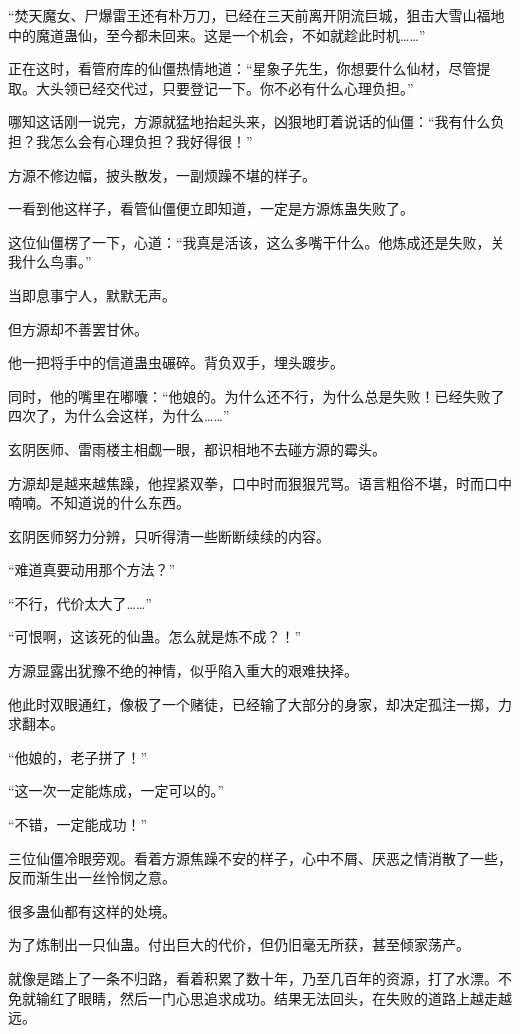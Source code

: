 \begin{this_body}
“焚天魔女、尸爆雷王还有朴万刀，已经在三天前离开阴流巨城，狙击大雪山福地中的魔道蛊仙，至今都未回来。这是一个机会，不如就趁此时机……”

正在这时，看管府库的仙僵热情地道：“星象子先生，你想要什么仙材，尽管提取。大头领已经交代过，只要登记一下。你不必有什么心理负担。”

哪知这话刚一说完，方源就猛地抬起头来，凶狠地盯着说话的仙僵：“我有什么负担？我怎么会有心理负担？我好得很！”

方源不修边幅，披头散发，一副烦躁不堪的样子。

一看到他这样子，看管仙僵便立即知道，一定是方源炼蛊失败了。

这位仙僵楞了一下，心道：“我真是活该，这么多嘴干什么。他炼成还是失败，关我什么鸟事。”

当即息事宁人，默默无声。

但方源却不善罢甘休。

他一把将手中的信道蛊虫碾碎。背负双手，埋头踱步。

同时，他的嘴里在嘟囔：“他娘的。为什么还不行，为什么总是失败！已经失败了四次了，为什么会这样，为什么……”

玄阴医师、雷雨楼主相觑一眼，都识相地不去碰方源的霉头。

方源却是越来越焦躁，他捏紧双拳，口中时而狠狠咒骂。语言粗俗不堪，时而口中喃喃。不知道说的什么东西。

玄阴医师努力分辨，只听得清一些断断续续的内容。

“难道真要动用那个方法？”

“不行，代价太大了……”

“可恨啊，这该死的仙蛊。怎么就是炼不成？！”

方源显露出犹豫不绝的神情，似乎陷入重大的艰难抉择。

他此时双眼通红，像极了一个赌徒，已经输了大部分的身家，却决定孤注一掷，力求翻本。

“他娘的，老子拼了！”

“这一次一定能炼成，一定可以的。”

“不错，一定能成功！”

三位仙僵冷眼旁观。看着方源焦躁不安的样子，心中不屑、厌恶之情消散了一些，反而渐生出一丝怜悯之意。

很多蛊仙都有这样的处境。

为了炼制出一只仙蛊。付出巨大的代价，但仍旧毫无所获，甚至倾家荡产。

就像是踏上了一条不归路，看着积累了数十年，乃至几百年的资源，打了水漂。不免就输红了眼睛，然后一门心思追求成功。结果无法回头，在失败的道路上越走越远。


\end{this_body}
